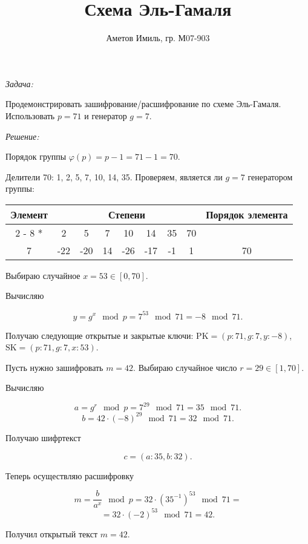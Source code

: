 \documentclass[10pt]{article}
\author{Аметов Имиль, гр. М07-903}
\title{Схема Эль-Гамаля}
\begin{document}
\maketitle

\emph{Задача:}

Продемонстрировать зашифрование/расшифрование по схеме Эль-Гамаля. Использовать $p = 71$ и генератор $g = 7$.

\emph{Решение:}

Порядок группы $\varphi (p) = p - 1 = 71 - 1 = 70$.

Делители 70: 1, 2, 5, 7, 10, 14, 35. Проверяем, является ли $g = 7$ генератором группы:

\begin{tabular}{|c|c|c|c|c|c|c|c|c|}
  \hline
  \multirow {2}{*}{Элемент} & \multicolumn {7}{c|}{Степени} & \multirow {2}{*}{Порядок элемента} \\ \cline{2 - 8}
  \multirow {2} {*}{} & 2 & 5 & 7 & 10 & 14 & 35 & 70 & \\ \hline
  7 & -22 & -20 & 14 & -26 & -17 & -1 & 1 & 70 \\ \hline
\end{tabular}

Выбираю случайное $x = 53 \in [0, 70]$.

Вычисляю

$$y = g^x \mod p = 7^{53} \mod 71 = -8 \mod 71.$$

Получаю следующие открытые и закрытые ключи: $\text{PK} = (p : 71, g : 7, y : -8)$, $\text{SK} = (p : 71, g : 7, x : 53)$.

Пусть нужно зашифровать $m = 42$. Выбираю случайное число $r = 29 \in [1, 70]$.

Вычисляю

$$a = g^r \mod p = 7^{29} \mod 71 = 35 \mod 71.$$
$$b = 42 \cdot (-8)^{29} \mod 71 = 32 \mod 71.$$

Получаю шифртекст

$$c = (a : 35, b : 32).$$

Теперь осуществляю расшифровку

$$m = \dfrac {b} {a^x} \mod p = 32 \cdot (35^{-1})^{53} \mod 71 = $$
$$= 32 \cdot (-2)^{53} \mod 71 = 42.$$

Получил открытый текст $m = 42$.
\end{document}
